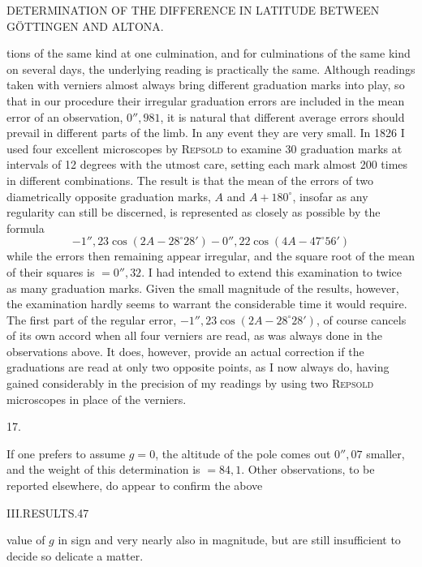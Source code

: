 \clearpage
\noindent{}\parbox[t]{\dimexpr\textwidth-10mm\relax}{\centering\scriptsize DETERMINATION OF THE DIFFERENCE IN LATITUDE BETWEEN GÖTTINGEN AND ALTONA.}\par
\noindent tions of the same kind at one culmination, and for culminations of the same kind on several days, the underlying reading is practically the same. Although readings taken with verniers almost always bring different graduation marks into play, so that in our procedure their irregular graduation errors are included in the mean error of an observation, $0''{,}981$, it is natural that different average errors should prevail in different parts of the limb. In any event they are very small. In 1826 I used four excellent microscopes by \textsc{Repsold} to examine 30 graduation marks at intervals of 12 degrees with the utmost care, setting each mark almost 200 times in different combinations. The result is that the mean of the errors of two diametrically opposite graduation marks, $A$ and $A+180^\circ$, insofar as any regularity can still be discerned, is represented as closely as possible by the formula
\[
-1''{,}23\cos(2A-28^\circ28')-0''{,}22\cos(4A-47^\circ56')
\]
while the errors then remaining appear irregular, and the square root of the mean of their squares is $=0''{,}32$. I had intended to extend this examination to twice as many graduation marks. Given the small magnitude of the results, however, the examination hardly seems to warrant the considerable time it would require. The first part of the regular error, $-1''{,}23\cos(2A-28^\circ28')$, of course cancels of its own accord when all four verniers are read, as was always done in the observations above. It does, however, provide an actual correction if the graduations are read at only two opposite points, as I now always do, having gained considerably in the precision of my readings by using two \textsc{Repsold} microscopes in place of the verniers.
\begin{center}17.\end{center}
If one prefers to assume $g=0$, the altitude of the pole comes out $0''{,}07$ smaller, and the weight of this determination is $=84{,}1$. Other observations, to be reported elsewhere, do appear to confirm the above

\clearpage
\noindent\mbox{}\hfill III.\quad RESULTS.\hfill 47\par
\noindent value of $g$ in sign and very nearly also in magnitude, but are still insufficient to decide so delicate a matter.


